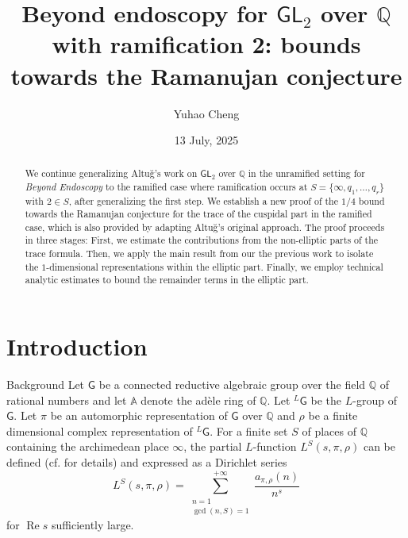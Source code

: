 \documentclass[10pt,oneside,reqno]{amsart}
\makeatletter
\renewcommand\AA{\mathbb{A}}
\newcommand\QQ{\mathbb{Q}}
\newcommand\G{\mathsf{G}}
\newcommand\GL{\mathsf{GL}}
\renewcommand\Re{\mathop{\mathrm{Re}}}
\def\subsection{\@startsection{subsection}{2}
  \z@{3pt\@plus0pt}{-.5em}%
  {\normalfont\bfseries}}
\theoremstyle{THEOREM}
\theoremstyle{DEFINITION}
\theoremstyle{EXERCISE}
\numberwithin{equation}{section}
\makeatother
\begin{document}
\setlength \lineskip{3pt}
\setlength \lineskiplimit{3pt}
\setlength \parskip{1pt}
\setlength \partopsep{0pt}

\title{Beyond endoscopy for $\GL_2$ over $\QQ$ with ramification 2: bounds towards the Ramanujan conjecture}
\author{Yuhao Cheng}
\address{Qiuzhen College, Tsinghua University, 100084, Beijing, China}
\date{13 July, 2025}
\begin{abstract}
We continue generalizing Altu\u{g}'s work on $\GL_2$ over $\QQ$  in the unramified setting for \emph{Beyond Endoscopy} to the ramified case where ramification occurs at $S=\{\infty,q_1,\dots,q_r\}$ with $2\in S$, after generalizing the first step. We establish a new proof of the $1/4$ bound towards the Ramanujan conjecture for the trace of the cuspidal part in the ramified case, which is also provided by adapting Altuğ's original approach. The proof proceeds in three stages: First, we estimate the contributions from the non-elliptic parts of the trace formula. Then, we apply the main result from our the previous work to isolate the $1$-dimensional representations within the elliptic part. Finally, we employ technical analytic estimates to bound the remainder terms in the elliptic part.
\end{abstract}

\maketitle
 
\tableofcontents

\section{Introduction}
\subsection{Background}
Let $\G$ be a connected reductive algebraic group over the field $\QQ$ of rational numbers and let $\AA$ denote the ad\`ele ring of $\QQ$. Let $^L\G$ be the $L$-group of $\G$. Let $\pi$ be an automorphic representation of $\G$ over $\QQ$ and $\rho$ be a finite dimensional complex representation of $^L\G$. For a finite set $S$ of places of $\QQ$ containing the archimedean place 
$\infty$, the partial $L$-function $L^{S}(s,\pi,\rho)$ can be defined (cf. \cite{getz2024} for details) and expressed as a Dirichlet series
\[
L^{S}(s,\pi,\rho)=\sum_{\substack{n=1\\ \gcd(n,S)=1}}^{+\infty}\frac{a_{\pi,\rho}(n)}{n^s}
\]
for $\Re s$ sufficiently large.
\end{document}
